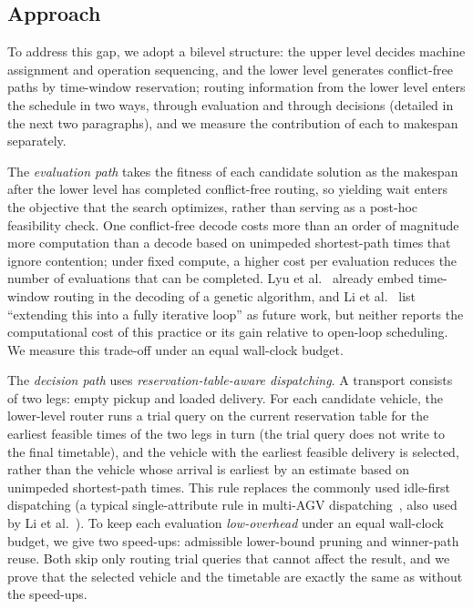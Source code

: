 \documentclass[manuscript,screen,review]{acmart}
\begin{document}
\subsection{Approach}

To address this gap, we adopt a bilevel structure: the upper level decides machine assignment and operation sequencing, and the lower level generates conflict-free paths by time-window reservation; routing information from the lower level enters the schedule in two ways, through evaluation and through decisions (detailed in the next two paragraphs), and we measure the contribution of each to makespan separately.

The \emph{evaluation path} takes the fitness of each candidate solution as the makespan after the lower level has completed conflict-free routing, so yielding wait enters the objective that the search optimizes, rather than serving as a post-hoc feasibility check.
One conflict-free decode costs more than an order of magnitude more computation than a decode based on unimpeded shortest-path times that ignore contention; under fixed compute, a higher cost per evaluation reduces the number of evaluations that can be completed.
Lyu et al.~\cite{lyu2019approach} already embed time-window routing in the decoding of a genetic algorithm, and Li et al.~\cite{li2026framework} list ``extending this into a fully iterative loop'' as future work, but neither reports the computational cost of this practice or its gain relative to open-loop scheduling. We measure this trade-off under an equal wall-clock budget.

The \emph{decision path} uses \emph{reservation-table-aware dispatching}. A transport consists of two legs: empty pickup and loaded delivery.
For each candidate vehicle, the lower-level router runs a trial query on the current reservation table for the earliest feasible times of the two legs in turn (the trial query does not write to the final timetable),
and the vehicle with the earliest feasible delivery is selected, rather than the vehicle whose arrival is earliest by an estimate based on unimpeded shortest-path times. This rule replaces the commonly used idle-first dispatching (a typical single-attribute rule in multi-AGV dispatching~\cite{lu2022agv}, also used by Li et al.~\cite{li2026framework}). To keep each evaluation \emph{low-overhead} under an equal wall-clock budget, we give two speed-ups:
admissible lower-bound pruning and winner-path reuse. Both skip only routing trial queries that cannot affect the result, and we prove that the selected vehicle and the timetable are exactly the same as without the speed-ups.
\end{document}

